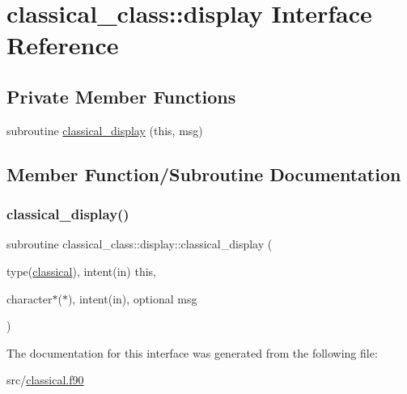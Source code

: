 \hypertarget{interfaceclassical__class_1_1display}{}\section{classical\+\_\+class\+:\+:display Interface Reference}
\label{interfaceclassical__class_1_1display}
\subsection*{Private Member Functions}
\begin{DoxyCompactItemize}
\item 
subroutine \hyperlink{interfaceclassical__class_1_1display_a38506ee13a51d8f959fcf71976eb13a7}{classical\+\_\+display} (this, msg)
\end{DoxyCompactItemize}


\subsection{Member Function/\+Subroutine Documentation}
\mbox{\label{interfaceclassical__class_1_1display_a38506ee13a51d8f959fcf71976eb13a7}} 
\subsubsection{\texorpdfstring{classical\+\_\+display()}{classical\_display()}}
{\footnotesize\ttfamily subroutine classical\+\_\+class\+::display\+::classical\+\_\+display (\begin{DoxyParamCaption}\item[{type(\hyperlink{structclassical__class_1_1classical}{classical}), intent(in)}]{this,  }\item[{character$\ast$($\ast$), intent(in), optional}]{msg }\end{DoxyParamCaption})\hspace{0.3cm}{\ttfamily [private]}}



The documentation for this interface was generated from the following file\+:\begin{DoxyCompactItemize}
\item 
src/\hyperlink{classical_8f90}{classical.\+f90}\end{DoxyCompactItemize}
